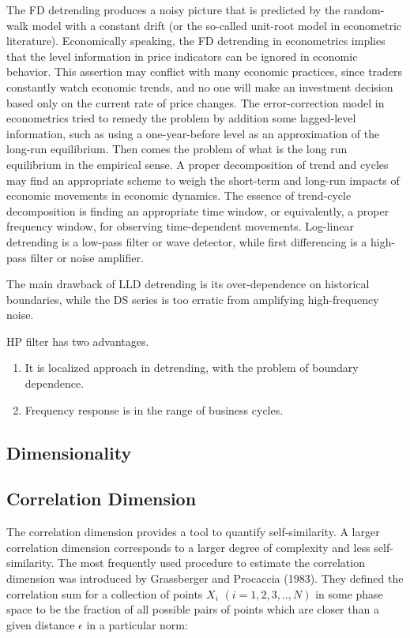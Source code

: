 The FD detrending produces a noisy picture that is predicted by the random-walk model with a constant drift (or the so-called unit-root model in econometric literature).  Economically speaking, the FD detrending in econometrics implies that the level information in price indicators can be ignored in economic behavior.  This assertion may conflict with many economic practices, since traders constantly watch economic trends, and no one will make an investment decision based only on the current rate of price changes.  The error-correction model in econometrics tried to remedy the problem by addition some lagged-level information, such as using a one-year-before level as an approximation of the long-run equilibrium. Then comes the problem of what is the long run equilibrium in the empirical sense.  A proper decomposition of trend and cycles may find an appropriate scheme to weigh the short-term and long-run impacts of economic movements in economic dynamics.  The essence of trend-cycle decomposition is finding an appropriate time window, or equivalently, a proper frequency window, for observing time-dependent movements.  Log-linear detrending is a low-pass filter or wave detector, while first differencing is a high-pass filter or noise amplifier. 

The main drawback of LLD detrending is its over-dependence on historical boundaries, while the DS series is too erratic from amplifying high-frequency noise. 

HP filter has two advantages. 
\begin{enumerate}
\item It is localized approach in detrending, with the problem of boundary dependence. 
\item Frequency response is in the range of business cycles. 
\end{enumerate}

\subsection{Dimensionality}

\subsection{Correlation Dimension}
The correlation dimension provides a tool to quantify self-similarity. A larger correlation dimension corresponds to a larger degree of complexity and less self-similarity. The most frequently used procedure to estimate the correlation dimension was introduced by Grassberger and Procaccia (1983). They defined the correlation sum for a collection of points $X_i$ $(i=1,2,3,..,N)$ in some phase space to be the fraction of all possible pairs of points which are closer than a given distance $\epsilon$ in a particular norm:

